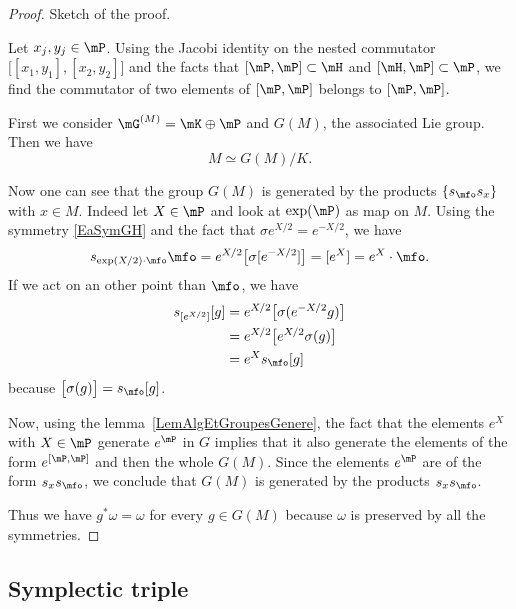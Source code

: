 \begin{proof}
	Sketch of the proof.

	Let $x_j,y_j\in\mP$. Using the Jacobi identity on the nested commutator $\big[ [x_1,y_1],[x_2,y_2] \big]$ and the facts that $[\mP,\mP]\subset\mH$ and $[\mH,\mP]\subset \mP$, we find the commutator of two elements of $[\mP,\mP]$ belongs to $[\mP,\mP]$.

	First we consider $\mG^{(M)}=\mK\oplus\mP$ and $G(M)$, the associated Lie group. Then we have
	\begin{equation}
		M\simeq G(M)/K.
	\end{equation}

	Now one can see that the group $G(M)$ is generated by the products $\{ s_{\mfo}s_x\}$ with $x\in M$. Indeed let $X\in\mP$ and look at $\exp(\mP)$ as map on $M$. Using the symmetry \eqref{EaSymGH} and the fact that $\sigma e^{X/2}= e^{-X/2}$, we have
	\begin{equation}
		s_{\exp(X/2)\cdot \mfo}\mfo= e^{X/2}\big[ \sigma[ e^{-X/2}] \big]=[ e^{X}]= e^{X}\cdot \mfo.
	\end{equation}
	If we act on an other point than $\mfo$, we have
	\begin{equation}
		\begin{aligned}[]
			s_{[ e^{X/2}]}[g] & = e^{X/2}\big[ \sigma( e^{-X/2}g) \big] \\
			                  & = e^{X/2}\big[  e^{X/2}\sigma(g) \big]  \\
			                  & = e^{X}s_{\mfo}[g]
		\end{aligned}
	\end{equation}
	because $\big[ \sigma(g) \big]=s_{\mfo}[g]$.

	Now, using the lemma~\ref{LemAlgEtGroupesGenere}, the fact that the elements $ e^{X}$ with $X\in\mP$ generate $ e^{\mP}$ in $G$ implies that it also generate the elements of the form $ e^{[\mP,\mP]}$ and then the whole $G(M)$. Since the elements $ e^{\mP}$ are of the form $s_{x}s_{\mfo}$, we conclude that $G(M)$ is generated by the products $s_{x}s_{\mfo}$.

	Thus we have $g^*\omega=\omega$ for every $g\in G(M)$ because $\omega$ is preserved by all the symmetries.
\end{proof}

\subsection{Symplectic triple}
\label{SubSecTripleSylple}

